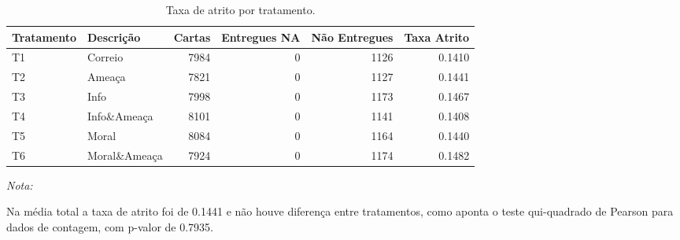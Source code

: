 \begin{table}[H]

\caption{\label{tab:atrito-level}Taxa de atrito por tratamento.}
\centering
\begin{threeparttable}
\begin{tabular}[t]{llrrrr}
\toprule
Tratamento & Descrição & Cartas & Entregues NA & Não Entregues & Taxa Atrito\\
\midrule
T1 & Correio & 7984 & 0 & 1126 & 0.1410\\
T2 & Ameaça & 7821 & 0 & 1127 & 0.1441\\
T3 & Info & 7998 & 0 & 1173 & 0.1467\\
T4 & Info\&Ameaça & 8101 & 0 & 1141 & 0.1408\\
T5 & Moral & 8084 & 0 & 1164 & 0.1440\\
\addlinespace
T6 & Moral\&Ameaça & 7924 & 0 & 1174 & 0.1482\\
\bottomrule
\end{tabular}
\begin{tablenotes}
\item \textit{Nota:} 
\item Na média total a taxa de atrito foi de 0.1441 e não houve diferença entre tratamentos, como aponta o teste qui-quadrado de Pearson para dados de contagem, com p-valor de 0.7935.
\end{tablenotes}
\end{threeparttable}
\end{table}
